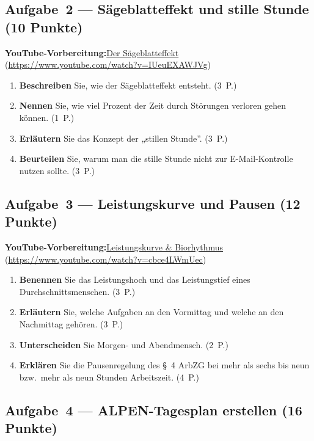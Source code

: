 \documentclass[11pt, a4paper]{article}
\begin{document}
\subsection*{Aufgabe~2 --- Sägeblatteffekt und stille Stunde (10 Punkte)}

\noindent\textbf{\color{bfwAccent}YouTube-Vorbereitung:}\enspace \href{https://www.youtube.com/watch?v=IUeuEXAWJVg}{Der Sägeblatteffekt} (\url{https://www.youtube.com/watch?v=IUeuEXAWJVg})

\medskip
\begin{enumerate}[label=(\alph*)]
  \item \textbf{Beschreiben} Sie, wie der Sägeblatteffekt entsteht. \hfill (3~P.)
  \item \textbf{Nennen} Sie, wie viel Prozent der Zeit durch Störungen verloren gehen können. \hfill (1~P.)
  \item \textbf{Erläutern} Sie das Konzept der „stillen Stunde”. \hfill (3~P.)
  \item \textbf{Beurteilen} Sie, warum man die stille Stunde nicht zur E-Mail-Kontrolle nutzen sollte. \hfill (3~P.)
\end{enumerate}

\subsection*{Aufgabe~3 --- Leistungskurve und Pausen (12 Punkte)}

\noindent\textbf{\color{bfwAccent}YouTube-Vorbereitung:}\enspace \href{https://www.youtube.com/watch?v=cbce4LWmUec}{Leistungskurve \& Biorhythmus} (\url{https://www.youtube.com/watch?v=cbce4LWmUec})

\medskip
\begin{enumerate}[label=(\alph*)]
  \item \textbf{Benennen} Sie das Leistungshoch und das Leistungstief eines Durchschnittsmenschen. \hfill (3~P.)
  \item \textbf{Erläutern} Sie, welche Aufgaben an den Vormittag und welche an den Nachmittag gehören. \hfill (3~P.)
  \item \textbf{Unterscheiden} Sie Morgen- und Abendmensch. \hfill (2~P.)
  \item \textbf{Erklären} Sie die Pausenregelung des §~4 ArbZG bei mehr als sechs bis neun bzw.\ mehr als neun Stunden Arbeitszeit. \hfill (4~P.)
\end{enumerate}

\subsection*{Aufgabe~4 --- ALPEN-Tagesplan erstellen (16 Punkte)}
\end{document}
